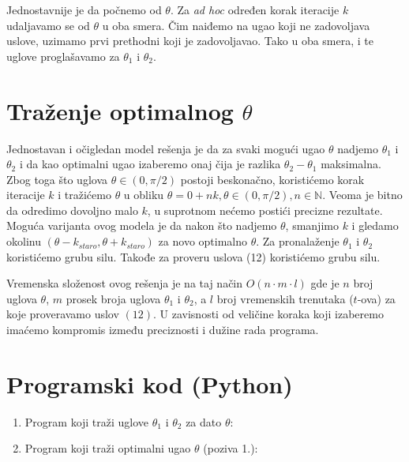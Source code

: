\documentclass[a4paper, 12pt]{article}
\begin{document}

Jednostavnije je da počnemo od $\theta$. Za \textit{ad hoc} određen korak iteracije $k$ udaljavamo se od $\theta$ u oba smera. Čim naiđemo na ugao koji ne zadovoljava uslove, uzimamo prvi prethodni koji je zadovoljavao. Tako u oba smera, i te uglove proglašavamo za $\theta_1$ i $\theta_2$.



\section{Traženje optimalnog $\theta$}

Jednostavan i očigledan model rešenja je da za svaki mogući ugao $\theta$ nadjemo $\theta_1$ i $\theta_2$ i da kao optimalni ugao izaberemo onaj čija je razlika $\theta_2 - \theta_1$ maksimalna. Zbog toga što uglova $\theta \in (0,\pi/2)$ postoji beskonačno, koristićemo korak iteracije $k$ i tražićemo $\theta$ u obliku $ \theta = 0 + nk, \theta \in (0,\pi/2), n \in  \mathbb{N}$. Veoma je bitno da odredimo dovoljno malo $k$, u suprotnom nećemo postići precizne rezultate. Moguća varijanta ovog modela je da nakon što nadjemo $\theta$, smanjimo $k$ i gledamo okolinu $(\theta - k_{staro}, \theta + k_{staro})$ za novo optimalno $\theta$.
Za pronalaženje $\theta_1$ i $\theta_2$ koristićemo grubu silu. Takođe za proveru uslova (12) koristićemo grubu silu.

Vremenska složenost ovog rešenja je na taj način $O(n \cdot m \cdot l)$ gde je $n$ broj uglova $\theta$, $m$ prosek broja uglova $\theta_1$ i $\theta_2$, a $l$ broj vremenskih trenutaka ($t$-ova) za koje proveravamo uslov $(12)$. U zavisnosti od veličine koraka koji izaberemo imaćemo kompromis između preciznosti i dužine rada programa.

\pagebreak



\section{Programski kod (Python)}

\begin{enumerate}

\item \large Program koji traži uglove $\theta_1$ i $\theta_2$ za dato $\theta$:



\item \large Program koji traži optimalni ugao $\theta$ (poziva 1.):



\end{enumerate}
\end{document}
